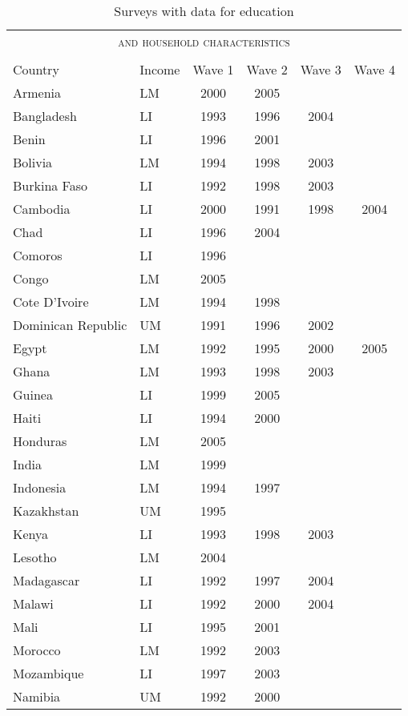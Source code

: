 \begin{table}[ht!]
\caption{Surveys with data for education}
\vspace{-7mm}
\label{tab:survey}
\begin{center}
\begin{tabular}{l l c c c c}
\multicolumn{6}{c}{\textsc{and household characteristics}}\\
& & & & &  \\
\toprule
Country	& Income &	Wave 1	&	Wave 2	&	Wave 3	&	Wave 4	\\
\midrule
Armenia	&	LM		&	2000	&	2005	&		&		\\
Bangladesh	&	LI	&	1993	&	1996	&	2004	&		\\
Benin	&	LI		&	1996	&	2001	&		&		\\
Bolivia	&	LM		&	1994	&	1998	&	2003	&		\\
Burkina Faso	&	LI &	1992	&	1998	&	2003	&		\\
Cambodia	&	LI	&	2000	&	1991	&	1998	&	2004	\\
Chad	&	LI		&	1996	&	2004	&		&		\\
Comoros	&	LI		&	1996	&		&		&		\\
Congo	&	LM		&	2005	&		&		&		\\
Cote D'Ivoire	&	LM	&	1994	&	1998	&		&		\\
Dominican Republic	&	UM	&	1991	&	1996	&	2002	&		\\
Egypt	&	LM	&	1992	&	1995	&	2000	&	2005	\\
Ghana	&	LM		&	1993	&	1998	&	2003	&		\\
Guinea	&	LI		&	1999	&	2005	&		&		\\
Haiti	&	LI		&	1994	&	2000	&		&		\\
Honduras	&	LM	&	2005	&		&		&		\\
India	&	LM		&	1999	&		&		&		\\
Indonesia	&	LM	&	1994	&	1997	&		&		\\
Kazakhstan	&	UM	&	1995	&		&		&		\\
Kenya	&	LI		&	1993	&	1998	&	2003	&		\\
Lesotho	&	LM		&	2004	&		&		&		\\
Madagascar	&	LI	&	1992	&	1997	&	2004	&		\\
Malawi	&	LI		&	1992	&	2000	&	2004	&		\\
Mali	&	LI		&	1995	&	2001	&		&		\\
Morocco	&	LM		&	1992	&	2003	&		&		\\
Mozambique	&	LI	&	1997	&	2003	&		&		\\
Namibia	&	UM		&	1992	&	2000	&		&		\\

\end{tabular}
\end{center}
\end{table}
